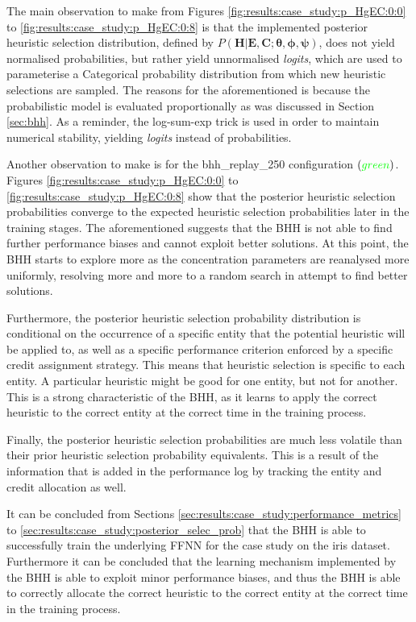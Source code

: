 The main observation to make from Figures \ref{fig:results:case_study:p_HgEC:0:0} to \ref{fig:results:case_study:p_HgEC:0:8} is that the implemented posterior heuristic selection distribution, defined by $P(\boldsymbol{H} \vert \boldsymbol{E}, \boldsymbol{C}; \boldsymbol{\theta}, \boldsymbol{\phi}, \boldsymbol{\psi})$, does not yield normalised probabilities, but rather yield unnormalised \textit{logits}, which are used to parameterise a Categorical probability distribution from which new heuristic selections are sampled. The reasons for the aforementioned is because the probabilistic model is evaluated proportionally as was discussed in Section \ref{sec:bhh}. As a reminder, the log-sum-exp trick is used in order to maintain numerical stability, yielding \textit{logits} instead of probabilities.

Another observation to make is for the bhh\_replay\_250 configuration $(\textcolor{green}{green})$. Figures \ref{fig:results:case_study:p_HgEC:0:0} to \ref{fig:results:case_study:p_HgEC:0:8} show that the posterior heuristic selection probabilities converge to the expected heuristic selection probabilities later in the training stages. The aforementioned suggests that the \acs{BHH} is not able to find further performance biases and cannot exploit better solutions. At this point, the \acs{BHH} starts to explore more as the concentration parameters are reanalysed more uniformly, resolving more and more to a random search in attempt to find better solutions.

Furthermore, the posterior heuristic selection probability distribution is conditional on the occurrence of a specific entity that the potential heuristic will be applied to, as well as a specific performance criterion enforced by a specific credit assignment strategy. This means that heuristic selection is specific to each entity. A particular heuristic might be good for one entity, but not for another. This is a strong characteristic of the \acs{BHH}, as it learns to apply the correct heuristic to the correct entity at the correct time in the training process.

Finally, the posterior heuristic selection probabilities are much less volatile than their prior heuristic selection probability equivalents. This is a result of the information that is added in the performance log by tracking the entity and credit allocation as well.

It can be concluded from Sections \ref{sec:results:case_study:performance_metrics} to \ref{sec:results:case_study:posterior_selec_prob} that the \acs{BHH} is able to successfully train the underlying \acs{FFNN} for the case study on the iris dataset. Furthermore it can be concluded that the learning mechanism implemented by the \acs{BHH} is able to exploit minor performance biases, and thus the \acs{BHH} is able to correctly allocate the correct heuristic to the correct entity at the correct time in the training process.

